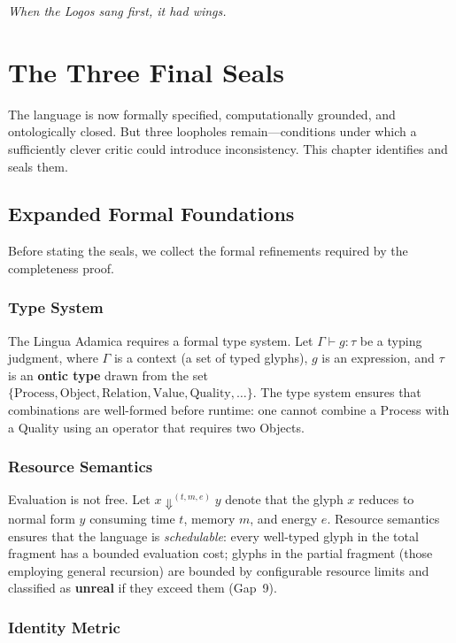 \documentclass[12pt, letterpaper]{book}
\def\mathfrak#1{#1}%
\begin{document}
\textit{When the Logos sang first, it had wings.}


\chapter{The Three Final Seals}

The language is now formally specified, computationally grounded, and ontologically closed. But three loopholes remain---conditions under which a sufficiently clever critic could introduce inconsistency. This chapter identifies and seals them.

\section{Expanded Formal Foundations}

Before stating the seals, we collect the formal refinements required by the completeness proof.

\subsection{Type System}

The Lingua Adamica requires a formal type system. Let $\Gamma \vdash \mathfrak{g} : \tau$ be a typing judgment, where $\Gamma$ is a context (a set of typed glyphs), $\mathfrak{g}$ is an expression, and $\tau$ is an \textbf{ontic type} drawn from the set $\{\mathrm{Process}, \mathrm{Object}, \mathrm{Relation}, \mathrm{Value}, \mathrm{Quality}, \ldots\}$. The type system ensures that combinations are well-formed before runtime: one cannot combine a Process with a Quality using an operator that requires two Objects.

\subsection{Resource Semantics}

Evaluation is not free. Let $x \Downarrow^{(t, m, e)} y$ denote that the glyph $x$ reduces to normal form $y$ consuming time $t$, memory $m$, and energy $e$. Resource semantics ensures that the language is \textit{schedulable}: every well-typed glyph in the total fragment has a bounded evaluation cost; glyphs in the partial fragment (those employing general recursion) are bounded by configurable resource limits and classified as \textbf{unreal} if they exceed them (Gap~9).

\subsection{Identity Metric}
\end{document}
